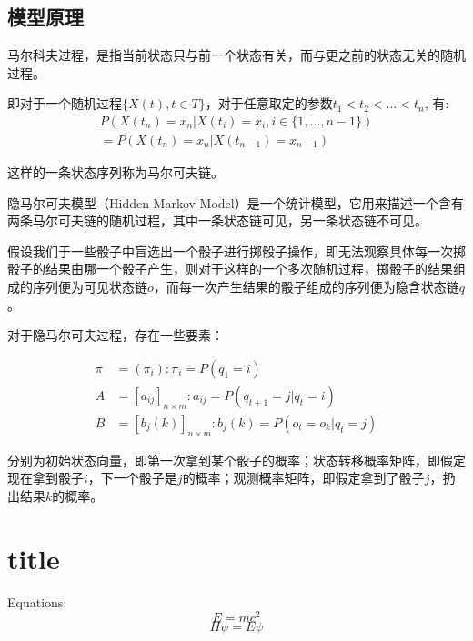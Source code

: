 \documentclass[hyperref]{ctexart}
\begin{document}
\begin{multicols}{2}
	\subsection{模型原理}
	马尔科夫过程，是指当前状态只与前一个状态有关，而与更之前的状态无关的随机过程。\par
    即对于一个随机过程$\{X(t), t\in T\}$，对于任意取定的参数$t_1 < t_2 < ... < t_n$,
    \noindent 有: 
	\begin{equation*}
	\begin{aligned}
	    P(X(t_n) = x_n | X(t_i) = x_i, i \in \{1,...,n - 1\})\\ = 
		P(X(t_n) = x_n | X(t_{n-1}) = x_{n - 1})
	\end{aligned}
	\end{equation*}\par
	\indent\par 这样的一条状态序列称为马尔可夫链。\par
	隐马尔可夫模型（Hidden Markov Model）是一个统计模型，它用来描述一个含有两条马尔可夫链的随机过程，其中一条状态链可见，另一条状态链不可见。\par
    假设我们于一些骰子中盲选出一个骰子进行掷骰子操作，即无法观察具体每一次掷骰子的结果由哪一个骰子产生，则对于这样的一个多次随机过程，掷骰子的结果组成的序列便为可见状态链$o$，而每一次产生结果的骰子组成的序列便为隐含状态链$q$。\par
    对于隐马尔可夫过程，存在一些要素：\par 
    \noindent
    \begin{equation*}
    \begin{aligned}
        \pi &= (\pi_i):\pi_i = P(q_1 = i)\\
        A &= [a_{ij}]_{n \times m} :a_{ij} = P(q_{t+1} = j|q_t = i)\\
        B &= [b_j(k)]_{n \times m}: b_j(k) = P(o_t = o_k|q_t = j)
    \end{aligned}
    \end{equation*}\par
    分别为初始状态向量，即第一次拿到某个骰子的概率；状态转移概率矩阵，即假定现在拿到骰子$i$，下一个骰子是$j$的概率；观测概率矩阵，即假定拿到了骰子$j$，扔出结果$k$的概率。
    
    
    
	\section{title}
	\noindent Equations: 
	\begin{equation}
		E=mc^2
	\end{equation}
	\begin{equation}
		H\psi=E\psi
	\end{equation}\\

\end{multicols}
\end{document}
